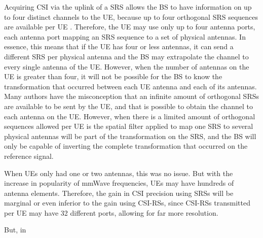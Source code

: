 Acquiring CSI via the uplink of a \ac{SRS} allows the BS to have information on up to four distinct channels to the UE, because up to four orthogonal SRS sequences are available per UE \cite{DAHLMAN2018}. Therefore, the UE may use only up to four antenna ports, each antenna port mapping an SRS sequence to a set of physical antennas. In essence, this means that if the UE has four or less antennas, it can send a different SRS per physical antenna and the BS may extrapolate the channel to every single antenna of the UE. However, when the number of antennas on the UE is greater than four, it will not be possible for the BS to know the transformation that occurred between each UE antenna and each of its antennas. Many authors \cite{7504159}  have the misconception that an infinite amount of orthogonal SRSs are available to be sent by the UE, and that is possible to obtain the channel to each antenna on the UE. However, when there is a limited amount of orthogonal sequences allowed per UE is the spatial filter applied to map one SRS to several physical antennas will be part of the transformation on the SRS, and the BS will only be capable of inverting the complete transformation that occurred on the reference signal. 

When UEs only had one or two antennas, this was no issue. But with the increase in popularity of mmWave frequencies, UEs may have hundreds of antenna elements. Therefore, the gain in CSI precision using SRSs will be marginal or even inferior to the gain using CSI-RSs, since CSI-RSs transmitted per UE may have 32 different ports, allowing for far more resolution. 

But, in 





